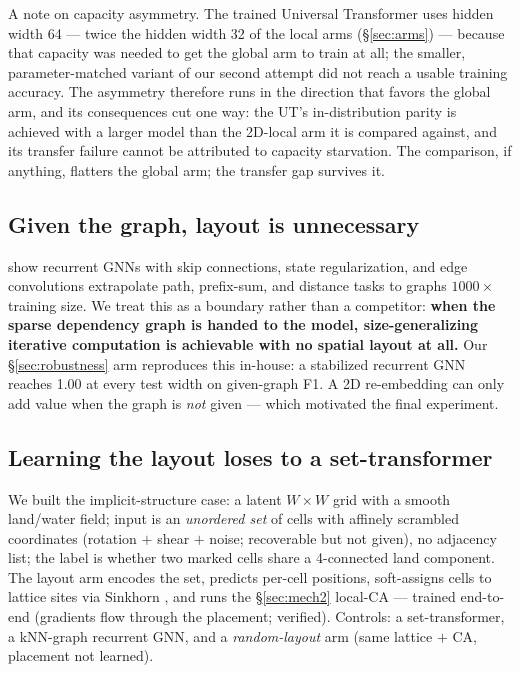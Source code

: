 \documentclass[11pt]{article}
\begin{document}
A note on capacity asymmetry. The trained Universal Transformer uses hidden
width 64 --- twice the hidden width 32 of the local arms
(\S\ref{sec:arms}) --- because that capacity was needed to get the global
arm to train at all; the smaller, parameter-matched variant of our second
attempt did not reach a usable training accuracy. The asymmetry therefore
runs in the direction that favors the global arm, and its consequences cut
one way: the UT's in-distribution parity is achieved with a larger model
than the 2D-local arm it is compared against, and its transfer failure
cannot be attributed to capacity starvation. The comparison, if anything,
flatters the global arm; the transfer gap survives it.

\subsection{Given the graph, layout is unnecessary}\label{sec:boundary-given}

\citet{groetschla2022recurrent} show recurrent GNNs with skip connections,
state regularization, and edge convolutions extrapolate path, prefix-sum, and
distance tasks to graphs $1000\times$ training size. We treat this as a
boundary rather than a competitor: \textbf{when the sparse dependency graph is
handed to the model, size-generalizing iterative computation is achievable
with no spatial layout at all.} Our \S\ref{sec:robustness} arm reproduces
this in-house: a stabilized recurrent GNN reaches 1.00 at every test width on
given-graph F1. A 2D re-embedding can only add value when the graph is
\emph{not} given --- which motivated the final experiment.

\subsection{Learning the layout loses to a set-transformer}\label{sec:boundary-layout}

We built the implicit-structure case: a latent $W \times W$ grid with a
smooth land/water field; input is an \emph{unordered set} of cells with
affinely scrambled coordinates (rotation $+$ shear $+$ noise; recoverable but
not given), no adjacency list; the label is whether two marked cells share a
4-connected land component. The layout arm encodes the set, predicts per-cell
positions, soft-assigns cells to lattice sites via Sinkhorn
\citep{cuturi2013sinkhorn, mena2018gumbel}, and runs the \S\ref{sec:mech2}
local-CA --- trained end-to-end (gradients flow through the placement;
verified). Controls: a set-transformer, a kNN-graph recurrent GNN, and a
\emph{random-layout} arm (same lattice $+$ CA, placement not learned).
\end{document}
